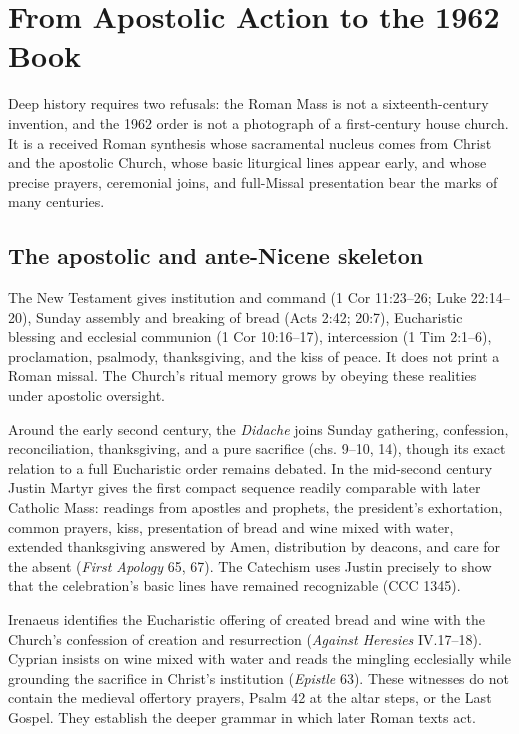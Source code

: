 \section{From Apostolic Action to the 1962 Book}

Deep history requires two refusals: the Roman Mass is not a sixteenth-century invention, and the 1962 order is not a photograph of a first-century house church. It is a received Roman synthesis whose sacramental nucleus comes from Christ and the apostolic Church, whose basic liturgical lines appear early, and whose precise prayers, ceremonial joins, and full-Missal presentation bear the marks of many centuries.

\subsection{The apostolic and ante-Nicene skeleton}

The New Testament gives institution and command (1 Cor 11:23--26; Luke 22:14--20), Sunday assembly and breaking of bread (Acts 2:42; 20:7), Eucharistic blessing and ecclesial communion (1 Cor 10:16--17), intercession (1 Tim 2:1--6), proclamation, psalmody, thanksgiving, and the kiss of peace. It does not print a Roman missal. The Church's ritual memory grows by obeying these realities under apostolic oversight.

Around the early second century, the \emph{Didache} joins Sunday gathering, confession, reconciliation, thanksgiving, and a pure sacrifice (chs. 9--10, 14), though its exact relation to a full Eucharistic order remains debated. In the mid-second century Justin Martyr gives the first compact sequence readily comparable with later Catholic Mass: readings from apostles and prophets, the president's exhortation, common prayers, kiss, presentation of bread and wine mixed with water, extended thanksgiving answered by Amen, distribution by deacons, and care for the absent (\emph{First Apology} 65, 67). The Catechism uses Justin precisely to show that the celebration's basic lines have remained recognizable (CCC 1345).

Irenaeus identifies the Eucharistic offering of created bread and wine with the Church's confession of creation and resurrection (\emph{Against Heresies} IV.17--18). Cyprian insists on wine mixed with water and reads the mingling ecclesially while grounding the sacrifice in Christ's institution (\emph{Epistle} 63). These witnesses do not contain the medieval offertory prayers, Psalm 42 at the altar steps, or the Last Gospel. They establish the deeper grammar in which later Roman texts act.

